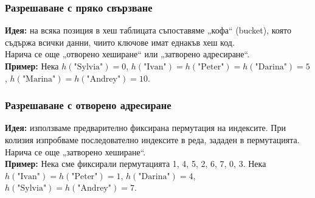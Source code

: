 \documentclass[alsotrans,beameroptions={aspectratio=169}]{beamerswitch}
\begin{document}
\begin{frame}
  \frametitle{Разрешаване с пряко свързване}
  \textbf{Идея:} на всяка позиция в хеш таблицата съпоставяме „кофа“ (bucket), която съдържа всички данни, чиито ключове имат еднакъв хеш код.\\
  \pause
  Нарича се още „отворено хеширане“ или „затворено адресиране“.\\
  \pause
  \textbf{Пример:} Нека $h(\text{"Sylvia"{}}) = 0$, $h(\text{"Ivan"{}}) = h(\text{"Peter"{}}) = h(\text{"Darina"{}}) = 5$, $h(\text{"Marina"{}}) = h(\text{"Andrey"{}}) = 10$.
  \begin{center}
    \small
  \end{center}
\end{frame}

\begin{frame}
  \frametitle{Разрешаване с отворено адресиране}
  \textbf{Идея:} използваме предварително фиксирана пермутация на индексите. При колизия изпробваме последователно индексите в реда, зададен в пермутацията.\\[2ex]
  \pause
  Нарича се още „затворено хеширане“.\\[2ex]
  \pause
  \textbf{Пример:} Нека сме фиксирали пермутацията 1, 4, 5, 2, 6, 7, 0, 3.
  Нека $h(\text{"Ivan"{}}) = h(\text{"Peter"{}}) = 1$, $h(\text{"Darina"{}}) = 4$, $h(\text{"Sylvia"{}}) = h(\text{"Andrey"{}}) = 7$.
  \begin{center}
    \small
  \end{center}
\end{frame}
\end{document}
